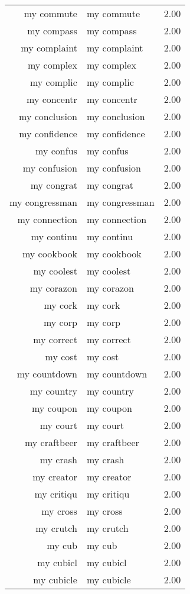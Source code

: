 \begin{table}[ht]
\begin{tabular}{rlr}
  my commute & my commute & 2.00 \\ 
  my compass & my compass & 2.00 \\ 
  my complaint & my complaint & 2.00 \\ 
  my complex & my complex & 2.00 \\ 
  my complic & my complic & 2.00 \\ 
  my concentr & my concentr & 2.00 \\ 
  my conclusion & my conclusion & 2.00 \\ 
  my confidence & my confidence & 2.00 \\ 
  my confus & my confus & 2.00 \\ 
  my confusion & my confusion & 2.00 \\ 
  my congrat & my congrat & 2.00 \\ 
  my congressman & my congressman & 2.00 \\ 
  my connection & my connection & 2.00 \\ 
  my continu & my continu & 2.00 \\ 
  my cookbook & my cookbook & 2.00 \\ 
  my coolest & my coolest & 2.00 \\ 
  my corazon & my corazon & 2.00 \\ 
  my cork & my cork & 2.00 \\ 
  my corp & my corp & 2.00 \\ 
  my correct & my correct & 2.00 \\ 
  my cost & my cost & 2.00 \\ 
  my countdown & my countdown & 2.00 \\ 
  my country & my country & 2.00 \\ 
  my coupon & my coupon & 2.00 \\ 
  my court & my court & 2.00 \\ 
  my craftbeer & my craftbeer & 2.00 \\ 
  my crash & my crash & 2.00 \\ 
  my creator & my creator & 2.00 \\ 
  my critiqu & my critiqu & 2.00 \\ 
  my cross & my cross & 2.00 \\ 
  my crutch & my crutch & 2.00 \\ 
  my cub & my cub & 2.00 \\ 
  my cubicl & my cubicl & 2.00 \\ 
  my cubicle & my cubicle & 2.00 \\ 

\end{tabular}
\end{table}

